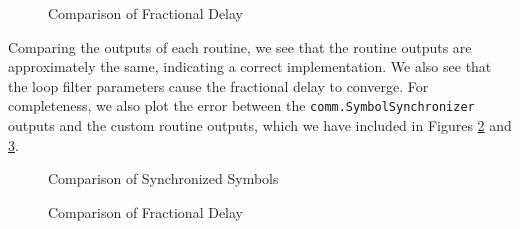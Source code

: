 \documentclass{article}
\begin{document}
\begin{figure}[H]
	\centerline{}
	\caption{Comparison of Fractional Delay}
	\label{fig::fractional_delay_no_noise}
\end{figure}

\noindent Comparing the outputs of each routine, we see that the routine outputs are approximately the same, indicating a correct implementation. We also see that the loop filter parameters cause the fractional delay to converge. For completeness, we also plot the error between the \texttt{comm.SymbolSynchronizer} outputs and the custom routine outputs, which we have included in Figures \ref{fig::symbol_sync_error} and \ref{fig::fractional_delay_error}.

\begin{figure}[H]
	\centerline{}
	\caption{Comparison of Synchronized Symbols}
	\label{fig::symbol_sync_error}
\end{figure}

\begin{figure}[H]
	\centerline{}
	\caption{Comparison of Fractional Delay}
	\label{fig::fractional_delay_error}
\end{figure}
\end{document}

